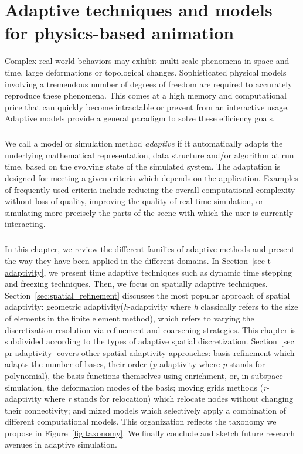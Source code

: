 \chapter[Adaptive physics-based animation]{Adaptive techniques and models for physics-based animation}
\label{chap:starAdaptivity}
Complex real-world behaviors may exhibit multi-scale phenomena in space and time, large deformations or topological changes.
Sophisticated physical models involving a tremendous number of degrees of freedom are required to accurately reproduce these phenomena.
This comes at a high memory and computational price that can quickly become intractable or prevent from an interactive usage.
Adaptive models provide a general paradigm to solve these efficiency goals.
\paragraph*{}
We call a model or simulation method \emph{adaptive} if it automatically adapts the underlying mathematical representation, data structure and/or algorithm at run time, based on the evolving state of the simulated system.
The adaptation is designed for meeting a given criteria which depends on the application. 
Examples of frequently used criteria include reducing the overall computational complexity without loss of quality, improving the quality of real-time simulation, or simulating more precisely the parts of the scene with which the user is currently interacting.
\paragraph*{}
In this chapter, we review the different families of adaptive methods and present the way they have been applied in the different domains. In Section~\ref{sec t adaptivity}, we present time adaptive techniques such as dynamic time stepping and freezing techniques.
Then, we focus on spatially adaptive techniques.
Section~\ref{sec:spatial_refinement} discusses the most popular approach of spatial adaptivity: geometric adaptivity(\textit{h}-adaptivity where \textit{h} classically refers to the size of elements in the finite element method), which refers to varying the discretization resolution via refinement and coarsening strategies. 
This chapter is subdivided according to the types of adaptive spatial discretization.
Section~\ref{sec pr adaptivity} covers other spatial adaptivity approaches: basis refinement which adapts the number of bases, their order (\textit{p}-adaptivity where \textit{p} stands for polynomial), the basis functions themselves using enrichment, or, in subspace simulation, the deformation modes of the basis; moving grids methods (\textit{r}-adaptivity where \textit{r} stands for relocation) which relocate nodes without changing their connectivity; and mixed models which selectively apply a combination of different computational models. This organization reflects the taxonomy we propose in Figure~\ref{fig:taxonomy}.
We finally conclude and sketch future research avenues in adaptive simulation.
